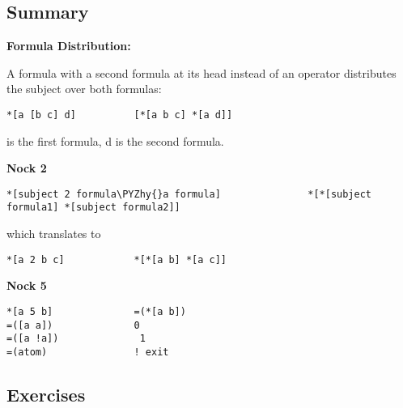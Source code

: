 \subsection{Summary}

\textbf{Formula Distribution:}

A formula with a second formula at its head instead of an operator distributes the subject over both formulas:
\begin{framed_shaded}
\begin{Verbatim}[fontsize=\relsize{-2.5},commandchars=\\\{\}]
*[a [b c] d]          [*[a b c] *[a d]]
\end{Verbatim}
\end{framed_shaded}
\kode{[b c]} is the first formula, d is the second formula.

\textbf{Nock 2}

\begin{framed_shaded}
\begin{Verbatim}[fontsize=\relsize{-2.5},commandchars=\\\{\}]
*[subject 2 formula\PYZhy{}a formula]               *[*[subject formula1] *[subject formula2]]
\end{Verbatim}
\end{framed_shaded}
which translates to

\begin{framed_shaded}
\begin{Verbatim}[fontsize=\relsize{-2.5},commandchars=\\\{\}]
*[a 2 b c]            *[*[a b] *[a c]]
\end{Verbatim}
\end{framed_shaded}
\textbf{Nock 5}
\begin{framed_shaded}
\begin{Verbatim}[fontsize=\relsize{-2.5},commandchars=\\\{\}]
*[a 5 b]              =(*[a b])
=([a a])              0
=([a !a])              1
=(atom)               ! exit
\end{Verbatim}
\end{framed_shaded}

\subsection{Exercises}

